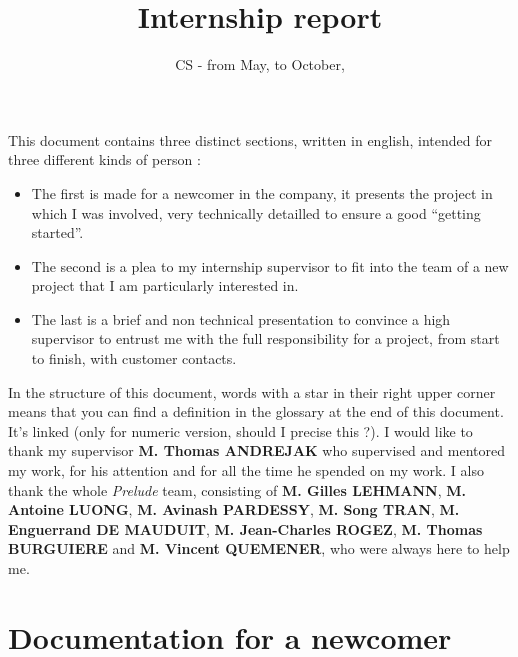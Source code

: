 \documentclass{koala-en}
\begin{document}
\title{Internship report}
\subtitle{CS - from  May,  to October, }


\summary
{
  This document contains three distinct sections, written in english, intended for three different kinds of person :
  \begin{itemize}
     \item The first is made for a newcomer in the company, it presents the project in which I was involved, very technically detailled to ensure a good ``getting started''.
     \item The second is a plea to my internship supervisor to fit into the team of a new project that I am particularly interested in.
     \item The last is a brief and non technical presentation to convince a high supervisor to entrust me with the full responsibility for a project, from start to finish, with customer contacts.
  \end{itemize}
In the structure of this document, words with a star in their right upper corner means that you can find a definition in the glossary at the end of this document. It's linked (only for numeric version, should I precise this ?).
  \newline
  \newline
  \newline
  \newline
  I would like to thank my supervisor \textbf{M. Thomas ANDREJAK} who supervised and mentored my work, for his attention and for all the time he spended on my work.
  \newline
  \newline
  I also thank the whole \emph{Prelude} team, consisting of \textbf{M. Gilles LEHMANN}, \textbf{M. Antoine LUONG}, \textbf{M. Avinash PARDESSY}, \textbf{M. Song TRAN}, \textbf{M. Enguerrand DE MAUDUIT}, \textbf{M. Jean-Charles ROGEZ}, \textbf{M. Thomas BURGUIERE} and \textbf{M. Vincent QUEMENER}, who were always here to help me.
}

\maketitle

\newpage
\thispagestyle{empty}

\tableofcontents

\clearpage
\thispagestyle{empty}
\newpage

\part{Documentation for a newcomer}
\end{document}
